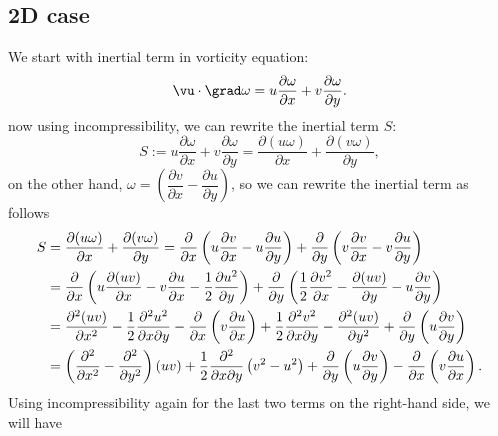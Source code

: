 \documentclass[12pt]{article}
\begin{document}
\subsection{2D case}
We start with inertial term in vorticity equation:
\begin{equation}\label{inertial}
\vu\cdot\grad\omega=u\dfrac{\partial \omega}{\partial x}+v\dfrac{\partial \omega}{\partial y}.
\end{equation}
now using incompressibility, we can rewrite the inertial term $S$:
\begin{equation}\label{inertial-incomp}
S :=u\dfrac{\partial \omega}{\partial x}+v\dfrac{\partial \omega}{\partial y}=\dfrac{\partial (u\omega)}{\partial x}+\dfrac{\partial (v\omega)}{\partial y},
\end{equation}
on the other hand, $\omega=\left(\dfrac{\partial v}{\partial x}-\dfrac{\partial u}{\partial y}\right)$, so we can rewrite the inertial term as follows
\begin{align}\label{inertial-incomp-vor}
S &=\dfrac{\partial (u\omega)}{\partial x}+\dfrac{\partial (v\omega)}{\partial y}=\dfrac{\partial}{\partial x} \left(u\dfrac{\partial v}{\partial x}-u\dfrac{\partial u}{\partial y}\right)+\dfrac{\partial}{\partial y} \left(v\dfrac{\partial v}{\partial x}-v\dfrac{\partial u}{\partial y}\right)\\
 &= \dfrac{\partial}{\partial x} \left(u\dfrac{\partial (uv)}{\partial x}-v\dfrac{\partial u}{\partial x}-\dfrac{1}{2}\dfrac{\partial u^2}{\partial y}\right)+\dfrac{\partial}{\partial y} \left(\dfrac{1}{2}\dfrac{\partial v^2}{\partial x}- \dfrac{\partial (uv)}{\partial y}-u\dfrac{\partial v}{\partial y}\right) 							  		\notag \\
&= \dfrac{\partial^2 (uv)}{\partial x^2}-\dfrac{1}{2}\dfrac{\partial^2 u^2}{\partial x \partial y}-\dfrac{\partial }{\partial x}\left(v\dfrac{\partial u}{\partial x}\right)+\dfrac{1}{2}\dfrac{\partial^2 v^2}{\partial x \partial y}-\dfrac{\partial^2 (uv)}{\partial y^2}+\dfrac{\partial }{\partial y}\left(u\dfrac{\partial v}{\partial y}\right) 		\notag \\
&= \left(\dfrac{\partial^2}{\partial x^2}-\dfrac{\partial^2}{\partial y^2}\right)(uv)+\dfrac{1}{2}\dfrac{\partial^2}{\partial x \partial y}\left(v^2 - u^2 \right)+\dfrac{\partial }{\partial y}\left(u\dfrac{\partial v}{\partial y}\right)-\dfrac{\partial }{\partial x}\left(v\dfrac{\partial u}{\partial x}\right).
\end{align}
Using incompressibility again for the last two terms on the right-hand side, we will have
\end{document}
